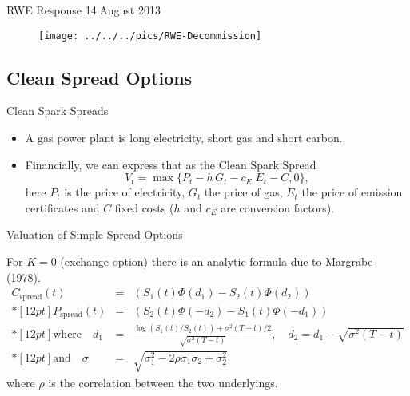 {RWE Response 14.August 2013}
\begin{figure}[htp]
\centering
\texttt{[image: ../../../pics/RWE-Decommission]}
\end{figure}




\subsection{Clean Spread Options}

{Clean Spark Spreads}
\begin{itemize}
\item<1-> A gas power plant is  long electricity, short gas and short carbon.
\item<2-> Financially, we can express that as the Clean Spark Spread
\begin{equation}
V_t = \max\{P_t - h\,G_t - c_E\;E_t - C, 0\},
\label{spark_spread_value}
\end{equation}
here  $P_t$ is the price of electricity, $G_t$ the price of gas, $E_t$ the price of emission certificates  and $C$ fixed costs ($h$ and $c_E$ are conversion factors).
\end{itemize}










{Valuation of Simple Spread Options}

For $K=0$ (exchange option) there is an analytic formula due to
Margrabe (1978).
$$\begin{array}{lll}
 C_{\mbox{spread}}(t) & = & (S_1(t)\Phi(d_1)-S_2(t)\Phi(d_2))
 \\*[12pt]
 P_{\mbox{spread}}(t) & = & (S_2(t)\Phi(-d_2)-S_1(t)\Phi(-d_1))
 \\*[12pt]
 \mbox{where}\quad d_1 & = & \frac{\log(S_1(t)/S_2(t))+\sigma^{2}(T-t)/2}{\sqrt{\sigma^{2}(T-t)}},\quad d_2=d_1-\sqrt{\sigma^{2}(T-t)}
 \\*[12pt]
 \mbox{and}\quad \sigma & = & \sqrt{\sigma_1^2-2\rho\sigma_1\sigma_2+\sigma_2^2}
\end{array}$$
where $\rho$ is the correlation between the two underlyings.

